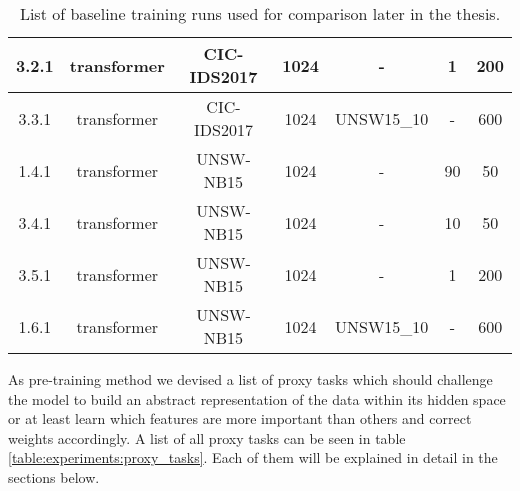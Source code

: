 \begin{table}[h]
{\begin{tabular}{c c c c c c c}
			3.2.1 \label{ex_1_2_3}           & transformer    & CIC-IDS2017     & 1024                                     & -			& 1                    & 200                                           \\ \midrule
			3.3.1 \label{ex_1_2_4}           & transformer    & CIC-IDS2017     & 1024                                     & UNSW15\_10	& -                    & 600                                           \\ \midrule
			1.4.1 \label{ex_1_2_5}           & transformer    & UNSW-NB15        & 1024                                     & -			& 90                   & 50                                            \\ \midrule
			3.4.1 \label{ex_1_2_6}           & transformer    & UNSW-NB15        & 1024                                     & -			& 10                   & 50                                            \\ \midrule
			3.5.1 \label{ex_1_2_7}           & transformer    & UNSW-NB15        & 1024                                     & -			& 1                    & 200                                           \\ \midrule
			1.6.1 \label{ex_1_2_8}           & transformer    & UNSW-NB15        & 1024                                     & UNSW15\_10	& -                    & 600                                           \\
	\end{tabular}}
	\caption{List of baseline training runs used for comparison later in the thesis.}
	\label{table:experiments:baseline}
\end{table}

As pre-training method we devised a list of proxy tasks which should challenge the model to build an abstract representation of the data within its hidden space or at least learn which features are more important than others and correct weights accordingly. A list of all proxy tasks can be seen in table \ref{table:experiments:proxy_tasks}. Each of them will be explained in detail in the sections below.

